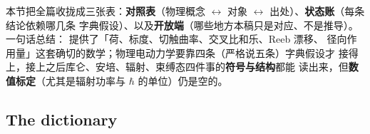 
\begin{cnread}
本节把全篇收拢成三张表：\textbf{对照表}（物理概念 $\leftrightarrow$
\AEG{} 对象 $\leftrightarrow$ 出处）、\textbf{状态账}（每条结论依赖哪几条
字典假设）、以及\textbf{开放端}（哪些地方本稿只是对应、不是推导）。
一句话总结：\AEG{} 提供了「荷、标度、切触曲率、交叉比和乐、Reeb 漂移、
径向作用量」这套确切的数学；物理电动力学要靠四条（严格说五条）字典假设才
接得上，接上之后库仑、安培、辐射、束缚态四件事的\textbf{符号与结构}都能
读出来，但\textbf{数值标定}（尤其是辐射功率与 $\hbar$ 的单位）仍是空的。
\end{cnread}

\subsection{The dictionary}

